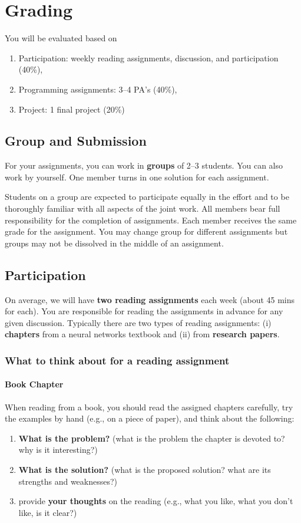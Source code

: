 \documentclass[11pt]{article}
\begin{document}
\section{Grading}
You will be evaluated based on
\begin{enumerate}
\item Participation:  weekly reading assignments, discussion, and participation (40\%),
\item Programming assignments: 3--4 PA's (40\%), 
\item Project: 1 final project  (20\%)
\end{enumerate}

\subsection*{Group and Submission} 
For your assignments, you can work in \textbf{groups} of 2--3 students.  You can also work by yourself. One member turns in one solution for each assignment. 

Students on a group are expected to participate equally in the effort
    and to be thoroughly familiar with all aspects of the joint work.
    All members bear full responsibility for the completion of
    assignments. 
    Each member receives the same grade for the assignment.  You may change group for different assignments but groups may not be dissolved in the middle of an assignment.
\subsection{Participation}
\label{sec:org16c195f}

On average, we will have \textbf{\textbf{two reading assignments}} each week (about 45 mins for each). 
You are responsible for reading the assignments in advance for any given discussion.  Typically there are two types of reading assignments:  (i) \textbf{chapters} from a neural networks textbook and (ii) from \textbf{research papers}.  

\subsubsection{What to think about for a reading assignment}\label{sec:reading}
\paragraph{Book Chapter} When reading from a book, you should read the assigned chapters carefully, try the examples by hand (e.g., on a piece of paper), and think about the following:
\begin{enumerate}
    \item  \textbf{What is the problem?} (what is the problem the chapter is devoted to? why is it interesting?)
    \item \textbf{What is the solution?} (what is the proposed solution? what are its strengths and weaknesses?)
    \item  provide \textbf{your thoughts} on the reading (e.g., what you like, what you don't like, is it clear?)

\end{enumerate}    
\end{document}
